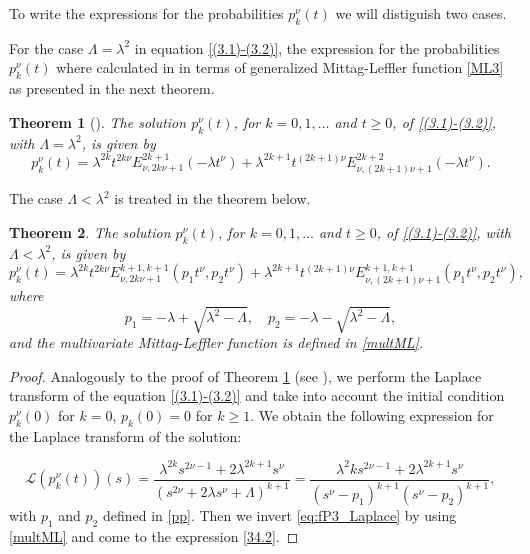 \documentclass[12pt]{article}
\theoremstyle{definition}
\theoremstyle{plain}
\newtheorem{theorem}{Theorem}
\begin{document}
To write the expressions for the probabilities ${p}_k^\nu(t)$ we will distiguish two cases. 

\medskip

For the case $\Lambda=\lambda^2$ in equation  \eqref{(3.1)-(3.2)}, 
 the expression for the probabilities ${p}_k^\nu(t)$  where calculated in \cite{BO2010} in terms of generalized Mittag-Leffler function \eqref{ML3} as presented in the next theorem.

\begin{theorem}[\cite{BO2010}]\label{fP2}
	The solution ${p}_k^\nu(t)$, for $k = 0, 1, \dots$ and $t \ge 0$, of \eqref{(3.1)-(3.2)}, with $\Lambda=\lambda^2$, is given by
	\begin{equation}\label{34}
		{p}_k^\nu(t) = \lambda^{2k} t^{2k\nu} E_{\nu, 2k\nu+1}^{2k+1}(-\lambda t^\nu) + \lambda^{2k+1} t^{(2k+1)\nu} E_{\nu, (2k+1)\nu+1}^{2k+2}(-\lambda t^\nu).
	\end{equation}
\end{theorem}

\medskip
The case  $\Lambda<\lambda^2$ is treated in the theorem below.

\begin{theorem}\label{fP3}
	The solution ${p}_k^\nu(t)$, for $k = 0, 1, \dots$ and $t \ge 0$, of \eqref{(3.1)-(3.2)}, with $\Lambda<\lambda^2$, is given by
	\begin{equation}\label{34.2}
		{p}_k^\nu(t) = \lambda^{2k} t^{2k\nu} E_{\nu, 2k\nu+1}^{k+1, k+1}(p_1 t^\nu, p_2 t^\nu) + \lambda^{2k+1} t^{(2k+1)\nu} E_{\nu, (2k+1)\nu+1}^{k+1, k+1}(p_1 t^\nu, p_2 t^\nu),
	\end{equation}
	where
	\begin{equation}\label{pp}
	p_1 = -\lambda + \sqrt{\lambda^2 - \Lambda}, \quad p_2 = -\lambda - \sqrt{\lambda^2 - \Lambda},
	\end{equation}
	and the multivariate Mittag-Leffler function is defined in \eqref{multML}.
\end{theorem}

	\begin{proof}
		Analogously to the proof of Theorem \ref{fP2} (see \cite{BO2010}), we perform the Laplace transform of the equation \eqref{(3.1)-(3.2)} and take into account the initial condition $p^{\nu}_k(0)$ for $k=0$, $p_k(0)=0$ for $k \geq 1$. We obtain the following expression for the Laplace transform of the solution:
		
		\begin{equation}\label{eq:fP3_Laplace}
			\mathcal{L}(p^{\nu}_{k}(t))(s) = \frac{\lambda^{2k} s^{2\nu - 1} + 2\lambda^{2k + 1}s^{\nu}}{(s^{2\nu} + 2\lambda s^{\nu} + \Lambda)^{k+1}} = \frac{\lambda^2k s^{2\nu - 1} + 2\lambda^{2k+1}s^{\nu}}{(s^{\nu} - p_1)^{k+1} (s^{\nu} - p_2)^{k+1}},   
		\end{equation}
with $p_1$ and $p_2$ defined in \eqref{pp}.		
				Then we invert \eqref{eq:fP3_Laplace} by using \eqref{multML} and come to the expression \eqref{34.2}.
	\end{proof}
\end{document}
